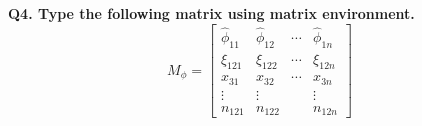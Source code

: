 \documentclass{article}
\begin{document}
	\noindent \textbf{Q4. Type the following matrix using matrix environment.}
	\[ M_\phi = \begin{bmatrix}
		\hat \phi_{11} & \hat \phi_{12} & \cdots & \hat \phi_{1n} \\
		\xi_{121} & \xi_{122} & \cdots & \xi_{12n} \\
		x_{31} & x_{32} & \cdots & x_{3n} \\ 
		\vdots & \vdots &   & \vdots \\
		n_{121}  & n_{122} &   & n_{12n}
	\end{bmatrix} \]
	
\end{document}
